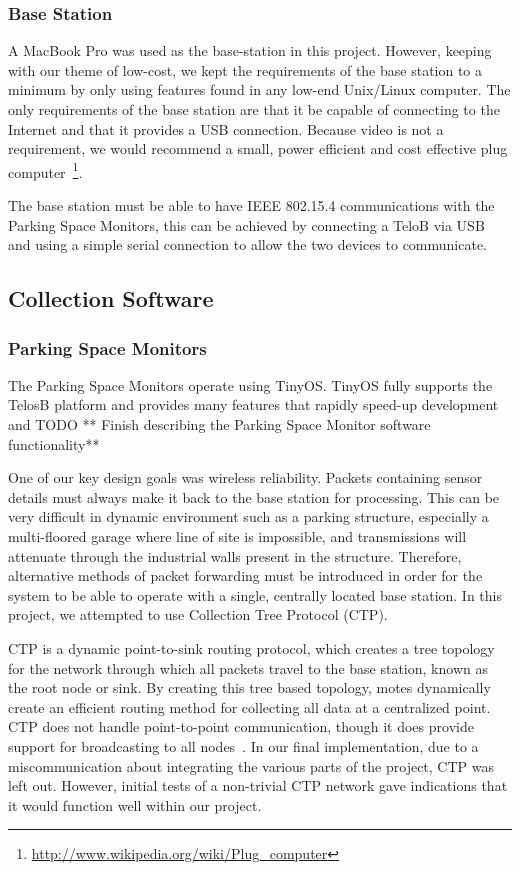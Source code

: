 \documentclass{acm_proc}
\begin{document}
\subsubsection{Base Station}
A MacBook Pro was used as the base-station in this project.
However, keeping with our theme of low-cost, we kept the
requirements of the base station to a minimum by only using features found
in any low-end Unix/Linux computer.
The only requirements of the base station are that it be capable of
connecting to the Internet and that it provides a USB connection.
Because video is not a requirement, we would recommend a small, power
efficient and cost effective plug
computer~\footnote{\url{http://www.wikipedia.org/wiki/Plug_computer}}.

The base station must be able to have IEEE 802.15.4 communications with the
Parking Space Monitors, this can be achieved by connecting a TeloB via USB
and using a simple serial connection to allow the two devices to
communicate.  

\subsection{Collection Software}

\subsubsection{Parking Space Monitors}

The Parking Space Monitors operate using TinyOS.
TinyOS fully supports the TelosB platform and provides many features that
rapidly speed-up development and TODO ** Finish describing the Parking
Space Monitor software functionality**

One of our key design goals was wireless reliability.
Packets containing sensor details must always make it back to the base station for processing.
This can be very difficult in dynamic environment such as a parking
structure, especially a multi-floored garage where line of site is
impossible, and transmissions will attenuate through the industrial walls present in the structure.
Therefore, alternative methods of packet forwarding must be introduced in
order for the system to be able to operate with a single, centrally located
base station.
In this project, we attempted to use Collection Tree Protocol (CTP).

CTP is a dynamic point-to-sink routing protocol, which creates a tree
topology for the network through which all packets travel to the base
station, known as the root node or sink.  By creating this tree based
topology, motes dynamically create an efficient routing method for
collecting all data at a centralized point.  CTP does not handle
point-to-point communication, though it does provide support for
broadcasting to all nodes~\cite{tep123:collection-tree-protocol}.
In our final implementation, due to a miscommunication about integrating
the various parts of the project, CTP was left out.
However, initial tests of a non-trivial CTP network gave indications that
it would function well within our project.
\end{document}
